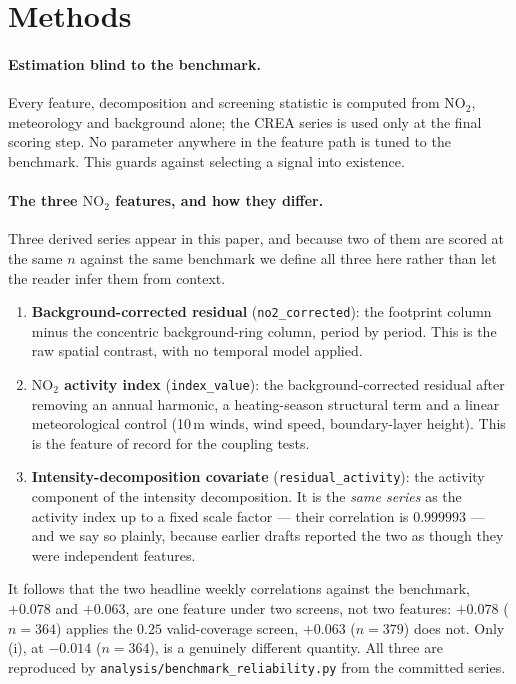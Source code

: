 \documentclass[11pt,a4paper]{article}
\providecommand{\ce}[1]{\ensuremath{\mathrm{#1}}}
\begin{document}
\section{Methods}
\label{sec:methods}

\paragraph{Estimation blind to the benchmark.} Every feature, decomposition and screening
statistic is computed from \ce{NO_2}, meteorology and background alone; the CREA series is used
only at the final scoring step. No parameter anywhere in the feature path is tuned to the
benchmark. This guards against selecting a signal into existence.

\paragraph{The three \ce{NO_2} features, and how they differ.} Three derived series appear in this
paper, and because two of them are scored at the same $n$ against the same benchmark we define all
three here rather than let the reader infer them from context.

\begin{enumerate}[leftmargin=1.6em,itemsep=0.2em,label=(\roman*)]
  \item \textbf{Background-corrected residual} (\texttt{no2\_corrected}): the footprint column
  minus the concentric background-ring column, period by period. This is the raw spatial contrast,
  with no temporal model applied.
  \item \textbf{\ce{NO_2} activity index} (\texttt{index\_value}): the background-corrected
  residual after removing an annual harmonic, a heating-season structural term and a linear
  meteorological control (10\,m winds, wind speed, boundary-layer height). This is the feature of
  record for the coupling tests.
  \item \textbf{Intensity-decomposition covariate} (\texttt{residual\_activity}): the activity
  component of the intensity decomposition. It is the \emph{same series} as the activity index up
  to a fixed scale factor --- their correlation is $0.999993$ --- and we say so plainly, because
  earlier drafts reported the two as though they were independent features.
\end{enumerate}

\noindent It follows that the two headline weekly correlations against the benchmark, $+0.078$ and
$+0.063$, are one feature under two screens, not two features: $+0.078$ ($n=364$) applies the
$0.25$ valid-coverage screen, $+0.063$ ($n=379$) does not. Only (i), at $-0.014$ ($n=364$), is a
genuinely different quantity. All three are reproduced by
\texttt{analysis/benchmark\_reliability.py} from the committed series.
\end{document}

